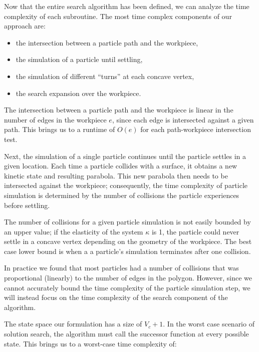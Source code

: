 Now that the entire search algorithm has been defined, we can analyze the time complexity of each subroutine. The most time complex components of our approach are:

\begin{itemize}
\item the intersection between a particle path and the workpiece,
\item the simulation of a particle until settling,
\item the simulation of different ``turns'' at each concave vertex,
\item the search expansion over the workpiece.
\end{itemize}

The intersection between a particle path and the workpiece is linear in the number of edges in the workpiece $e$, since each edge is intersected against a given path. This brings us to a runtime of $O(e)$ for each path-workpiece intersection test.

Next, the simulation of a single particle continues until the particle settles in a given location. Each time a particle collides with a surface, it obtains a new kinetic state and resulting parabola. This new parabola then needs to be intersected against the workpiece; consequently, the time complexity of particle simulation is determined by the number of collisions the particle experiences before settling.

The number of collisions for a given particle simulation is not easily bounded by an upper value; if the elasticity of the system $\kappa$ is 1, the particle could never settle in a concave vertex depending on the geometry of the workpiece. The best case lower bound is when a a particle's simulation terminates after one collision.

In practice we found that most particles had a number of collisions that was proportional (linearly) to the number of edges in the polygon. However, since we cannot accurately bound the time complexity of the particle simulation step, we will instead focus on the time complexity of the search component of the algorithm.

The state space our formulation has a size of $V_{c} + 1$. In the worst case scenario of solution search, the algorithm must call the successor function at every possible state. This brings us to a worst-case time complexity of:

 {
	\label{eq:bigo}
}